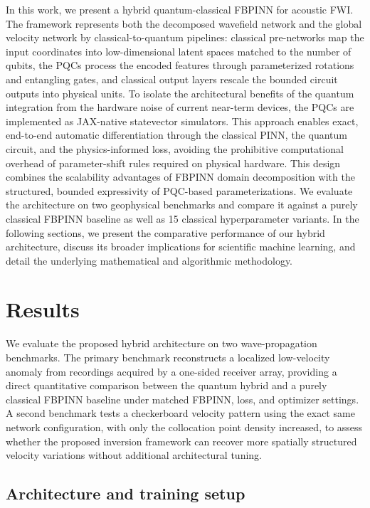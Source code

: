 \documentclass[11pt,a4paper]{article}
\begin{document}
In this work, we present a hybrid quantum-classical FBPINN for acoustic FWI. The framework represents both the decomposed wavefield network and the global velocity network by classical-to-quantum pipelines: classical pre-networks map the input coordinates into low-dimensional latent spaces matched to the number of qubits, the PQCs process the encoded features through parameterized rotations and entangling gates, and classical output layers rescale the bounded circuit outputs into physical units. To isolate the architectural benefits of the quantum integration from the hardware noise of current near-term devices, the PQCs are implemented as JAX-native statevector simulators. This approach enables exact, end-to-end automatic differentiation through the classical PINN, the quantum circuit, and the physics-informed loss, avoiding the prohibitive computational overhead of parameter-shift rules required on physical hardware. This design combines the scalability advantages of FBPINN domain decomposition with the structured, bounded expressivity of PQC-based parameterizations. We evaluate the architecture on two geophysical benchmarks and compare it against a purely classical FBPINN baseline as well as 15 classical hyperparameter variants. In the following sections, we present the comparative performance of our hybrid architecture, discuss its broader implications for scientific machine learning, and detail the underlying mathematical and algorithmic methodology.

\section{Results}\label{sec:results}

We evaluate the proposed hybrid architecture on two wave-propagation benchmarks. The primary benchmark reconstructs a localized low-velocity anomaly from recordings acquired by a one-sided receiver array, providing a direct quantitative comparison between the quantum hybrid and a purely classical FBPINN baseline under matched FBPINN, loss, and optimizer settings. A second benchmark tests a checkerboard velocity pattern using the exact same network configuration, with only the collocation point density increased, to assess whether the proposed inversion framework can recover more spatially structured velocity variations without additional architectural tuning.

\subsection{Architecture and training setup}
\label{sec:results_setup}
\end{document}
